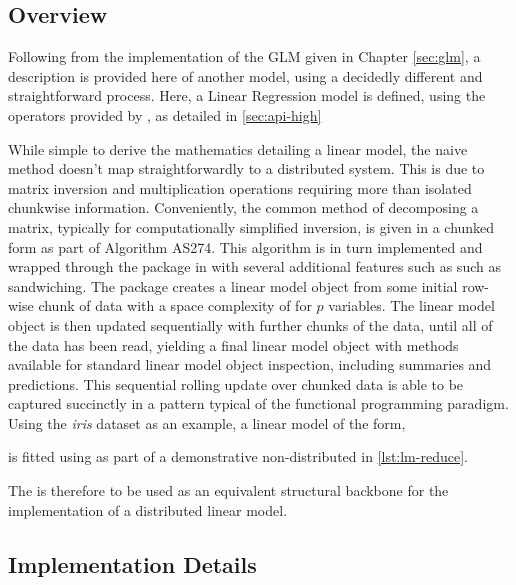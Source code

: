 \subsection{Overview}

Following from the implementation of the GLM given in Chapter \cref{sec:glm}, a description is provided here of another model, using a decidedly different and straightforward process.
Here, a Linear Regression model is defined, using the operators provided by \lso{}, as detailed in \cref{sec:api-high}

While simple to derive the mathematics detailing a linear model, the naive method doesn't map straightforwardly to a distributed system.
This is due to matrix inversion and multiplication operations requiring more than isolated chunkwise information.
Conveniently, the common method of decomposing a matrix, typically for computationally simplified inversion, is given in a chunked form as part of Algorithm AS274\cite{miller1992as274}.
This algorithm is in turn implemented and wrapped through the  package in \R{} with several additional features such as such as sandwiching\cite{lumley2013biglm}.
The  package creates a linear model object from some initial row-wise chunk of data with a space complexity of  for $p$ variables.
The linear model object is then updated sequentially with further chunks of the data, until all of the data has been read, yielding a final linear model object with methods available for standard linear model object inspection, including summaries and predictions.
This sequential rolling update over chunked data is able to be captured succinctly in a  pattern typical of the functional programming paradigm.
Using the \textit{iris} dataset as an example, a linear model of the form, 


is fitted using  as part of a demonstrative non-distributed  in \cref{lst:lm-reduce}.


The  is therefore to be used as an equivalent structural backbone for the implementation of a distributed linear model.

\subsection{Implementation Details}

